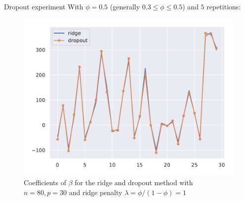 \documentclass[10pt,aspectratio=43]{beamer}
\begin{document}
\begin{frame}{Dropout experiment}
    With $\phi = 0.5$ (generally $0.3 \leq \phi \leq 0.5$) and $5$ repetitions:
    \begin{figure}
        \centering
        \includegraphics[scale=.5]{dropout.pdf}
        \caption{Coefficients of $\beta$ for the ridge and dropout method with $n=80, p=30$ and ridge penalty $\lambda=\phi / (1 - \phi)=1$}
    \end{figure}
\end{frame}

\end{document}
